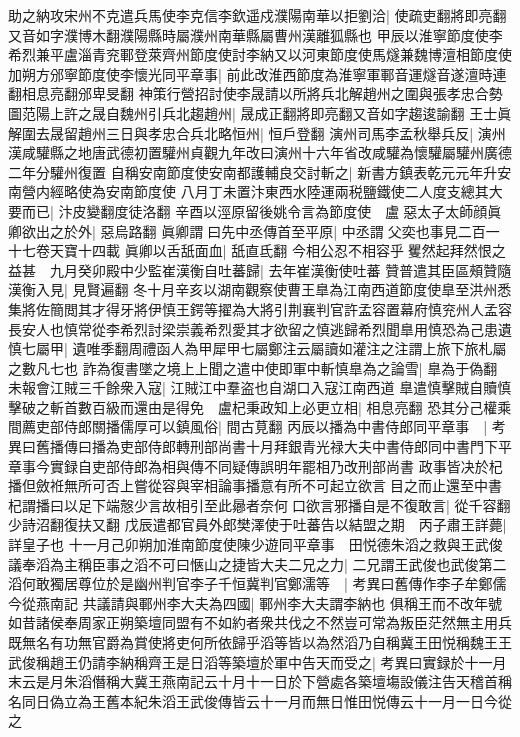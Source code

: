 助之納攻宋州不克遣兵馬使李克信李欽遥戍濮陽南華以拒劉洽|{
	使疏吏翻將即亮翻又音如字濮博木翻濮陽縣時屬濮州南華縣屬曹州漢離狐縣也}
甲辰以淮寧節度使李希烈兼平盧淄青兖鄆登萊齊州節度使討李納又以河東節度使馬燧兼魏博澶相節度使加朔方邠寧節度使李懷光同平章事|{
	前此改淮西節度為淮寧軍鄆音運燧音遂澶時連翻相息亮翻邠卑旻翻}
神策行營招討使李晟請以所將兵北解趙州之圍與張孝忠合勢圖范陽上許之晟自魏州引兵北趨趙州|{
	晟成正翻將即亮翻又音如字趨逡諭翻}
王士眞解圍去晟留趙州三日與孝忠合兵北略恒州|{
	恒戶登翻}
演州司馬李孟秋舉兵反|{
	演州漢咸驩縣之地唐武德初置驩州貞觀九年改曰演州十六年省改咸驩為懷驩屬驩州廣德二年分驩州復置}
自稱安南節度使安南都護輔良交討斬之|{
	新書方鎮表乾元元年升安南營内經略使為安南節度使}
八月丁未置汴東西水陸運兩税鹽鐵使二人度支總其大要而已|{
	汴皮變翻度徒洛翻}
辛酉以涇原留後姚令言為節度使　盧惡太子太師顔眞卿欲出之於外|{
	惡烏路翻}
眞卿謂曰先中丞傳首至平原|{
	中丞謂父奕也事見二百一十七卷天寶十四載}
眞卿以舌舐面血|{
	舐直氐翻}
今相公忍不相容乎矍然起拜然恨之益甚　九月癸卯殿中少監崔漢衡自吐蕃歸|{
	去年崔漢衡使吐蕃}
贊普遣其臣區頰贊隨漢衡入見|{
	見賢遍翻}
冬十月辛亥以湖南觀察使曹王臯為江南西道節度使臯至洪州悉集將佐簡閲其才得牙將伊慎王鍔等擢為大將引荆襄判官許孟容置幕府慎兖州人孟容長安人也慎常從李希烈討梁崇義希烈愛其才欲留之慎逃歸希烈聞臯用慎恐為己患遺慎七屬甲|{
	遺唯季翻周禮函人為甲犀甲七屬鄭注云屬讀如灌注之注謂上旅下旅札屬之數凡七也}
詐為復書墜之境上上聞之遣中使即軍中斬慎臯為之論雪|{
	臯為于偽翻}
未報會江賊三千餘衆入寇|{
	江賊江中羣盗也自湖口入寇江南西道}
臯遣慎擊賊自贖慎擊破之斬首數百級而還由是得免　盧杞秉政知上必更立相|{
	相息亮翻}
恐其分己權乘間薦吏部侍郎關播儒厚可以鎮風俗|{
	間古莧翻}
丙辰以播為中書侍郎同平章事　|{
	考異曰舊播傳曰播為吏部侍郎轉刑部尚書十月拜銀青光禄大夫中書侍郎同中書門下平章事今實録自吏部侍郎為相與傳不同疑傳誤明年罷相乃改刑部尚書}
政事皆决於杞播但斂袵無所可否上嘗從容與宰相論事播意有所不可起立欲言目之而止還至中書杞謂播曰以足下端慤少言故相引至此曏者奈何口欲言邪播自是不復敢言|{
	從千容翻少詩沼翻復扶又翻}
戊辰遣都官員外郎樊澤使于吐蕃告以結盟之期　丙子肅王詳薨|{
	詳皇子也}
十一月己卯朔加淮南節度使陳少遊同平章事　田悦德朱滔之救與王武俊議奉滔為主稱臣事之滔不可曰愜山之捷皆大夫二兄之力|{
	二兄謂王武俊也武俊第二}
滔何敢獨居尊位於是幽州判官李子千恒冀判官鄭濡等　|{
	考異曰舊傳作李子牟鄭儒今從燕南記}
共議請與鄆州李大夫為四國|{
	鄆州李大夫謂李納也}
俱稱王而不改年號如昔諸侯奉周家正朔築壇同盟有不如約者衆共伐之不然豈可常為叛臣茫然無主用兵既無名有功無官爵為賞使將吏何所依歸乎滔等皆以為然滔乃自稱冀王田悦稱魏王王武俊稱趙王仍請李納稱齊王是日滔等築壇於軍中告天而受之|{
	考異曰實録於十一月末云是月朱滔僭稱大冀王燕南記云十月十一日於下營處各築壇塲設儀注告天稽首稱名同日偽立為王舊本紀朱滔王武俊傳皆云十一月而無日惟田悦傳云十一月一日今從之}

